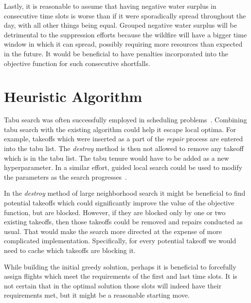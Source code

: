 Lastly, it is reasonable to assume that having negative water surplus in consecutive time slots is worse than if it were sporadically spread throughout the day, with all other things being equal.
Grouped negative water surplus will be detrimental to the suppression efforts because the wildfire will have a bigger time window in which it can spread, possibly requiring more resources than expected in the future.
It would be beneficial to have penalties incorporated into the objective function for such consecutive shortfalls.


\section{Heuristic Algorithm}

Tabu search was often successfully employed in scheduling problems~\cite{Brandimarte/TS}\cite{Dell/TS}.
Combining tabu search with the existing algorithm could help it escape local optima.
For example, takeoffs which were inserted as a part of the \textit{repair} process are entered into the tabu list.
The \textit{destroy} method is then not allowed to remove any takeoff which is in the tabu list.
The tabu tenure would have to be added as a new hyperparameter.
In a similar effort, guided local search could be used to modify the parameters as the search progresses~\cite{Voudouris/GLS}.

In the \textit{destroy} method of large neighborhood search it might be beneficial to find potential takeoffs which could significantly improve the value of the objective function, but are blocked.
However, if they are blocked only by one or two existing takeoffs, then those takeoffs could be removed and repairs conducted as usual.
That would make the search more directed at the expense of more complicated implementation.
Specifically, for every potential takeoff we would need to cache which takeoffs are blocking it.

While building the initial greedy solution, perhaps it is beneficial to forcefully assign flights which meet the requirements of the first and last time slots.
It is not certain that in the optimal solution those slots will indeed have their requirements met, but it might be a reasonable starting move.
